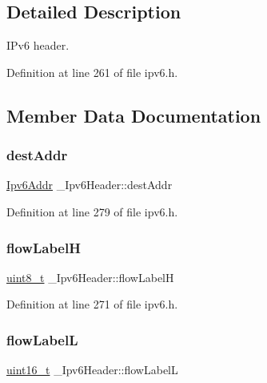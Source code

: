 \subsection{Detailed Description}
I\+Pv6 header. 

Definition at line 261 of file ipv6.\+h.



\subsection{Member Data Documentation}
\mbox{\label{struct__Ipv6Header_ab0549c93e9ce542f3edd652e812ddfef}} 
\subsubsection{\texorpdfstring{dest\+Addr}{destAddr}}
{\footnotesize\ttfamily \hyperlink{ipv6_8h_aed0cbc40c61ed5b4fb681ebc55237e89}{Ipv6\+Addr} \+\_\+\+Ipv6\+Header\+::dest\+Addr}



Definition at line 279 of file ipv6.\+h.

\mbox{\label{struct__Ipv6Header_adf6f740f5886b69780307b65dd820b69}} 
\subsubsection{\texorpdfstring{flow\+LabelH}{flowLabelH}}
{\footnotesize\ttfamily \hyperlink{stdint_8h_aba7bc1797add20fe3efdf37ced1182c5}{uint8\+\_\+t} \+\_\+\+Ipv6\+Header\+::flow\+LabelH}



Definition at line 271 of file ipv6.\+h.

\mbox{\label{struct__Ipv6Header_aee825a8e47e4188c0e52fc501bd62d8f}} 
\subsubsection{\texorpdfstring{flow\+LabelL}{flowLabelL}}
{\footnotesize\ttfamily \hyperlink{stdint_8h_a273cf69d639a59973b6019625df33e30}{uint16\+\_\+t} \+\_\+\+Ipv6\+Header\+::flow\+LabelL}



